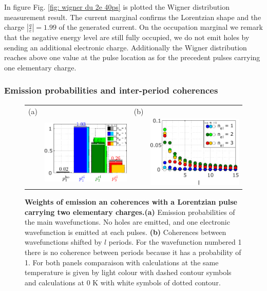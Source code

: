 In figure Fig. \ref{fig: wigner du 2e 40ps} is plotted the Wigner distribution measurement result.
The current marginal confirms the Lorentzian shape and the charge $\left|\frac{q}{e}\right| = 1.99$ of the generated current.
On the occupation marginal we remark that the negative energy level are still fully occupied, we do not emit holes by sending an additional electronic charge.
Additionally the Wigner distribution reaches above one value at the pulse location as for the precedent pulses carrying one elementary charge.

\subsubsection*{Emission probabilities and inter-period coherences}

\begin{figure}[hptb]
	\begin{center}
		\begin{tabular}{c c c c}
			
			(a) & & (b) &  \\ 
			& \includegraphics[width = 6.5 cm]{./chap1/JnlData_leviton_40ps_2e_51mK_Projected_Gradient_Method_proba} &
			& \includegraphics[width = 6.5 cm]{./chap1/JnlData_leviton_40ps_2e_51mK_Projected_Gradient_Method_coh} \\
		\end{tabular} 
	\end{center}
	\caption{\textbf{Weights of emission an coherences with a Lorentzian pulse carrying two elementary charges.}\textbf{(a)} Emission probabilities of the main wavefunctions. No holes are emitted, and one electronic wavefunction is emitted at each pulses. \textbf{(b)} Coherences between wavefunctions shifted by $l$ periods. For the wavefunction numbered 1 there is no coherence between periods because it has a probability of 1. For both panels comparaison with calculations at the same temperature is given by light colour with dashed contour symbols and calculations at 0 K with white symbols of dotted contour.}
	\label{fig: Jnl du 2e 40ps}
\end{figure}

